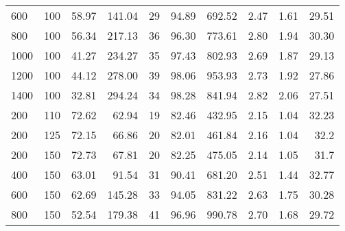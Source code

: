 \begin{table}[H]
{{\begin{tabular}{lrrrrrrrrr}
                600        & 100                  & 58.97             & 141.04          & 29       & 94.89          & 692.52                     & 2.47      & 1.61              & 29.51                    \\
                800        & 100                  & 56.34             & 217.13          & 36       & 96.30          & 773.61                     & 2.80      & 1.94              & 30.30                    \\
                1000       & 100                  & 41.27             & 234.27          & 35       & 97.43          & 802.93                     & 2.69      & 1.87              & 29.13                    \\
                1200       & 100                  & 44.12             & 278.00          & 39       & 98.06          & 953.93                     & 2.73      & 1.92              & 27.86                    \\
                1400       & 100                  & 32.81             & 294.24          & 34       & 98.28          & 841.94                     & 2.82      & 2.06              & 27.51                    \\                200        & 110                  & 72.62             & 62.94           & 19       & 82.46          & 432.95                     & 2.15      & 1.04              & 32.23                    \\
                200        & 125                  & 72.15             & 66.86           & 20       & 82.01          & 461.84                     & 2.16      & 1.04              & 32.2                     \\
                200        & 150                  & 72.73             & 67.81           & 20       & 82.25          & 475.05                     & 2.14      & 1.05              & 31.7                     \\
                400        & 150                  & 63.01             & 91.54           & 31       & 90.41          & 681.20                     & 2.51      & 1.44              & 32.77                    \\
                600        & 150                  & 62.69             & 145.28          & 33       & 94.05          & 831.22                     & 2.63      & 1.75              & 30.28                    \\
                800        & 150                  & 52.54             & 179.38          & 41       & 96.96          & 990.78                     & 2.70      & 1.68              & 29.72                    \\

\end{tabular}}}
\end{table}
